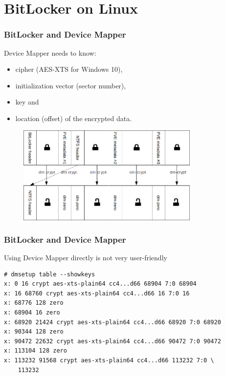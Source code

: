 \documentclass{beamer}
\begin{document}
\section{BitLocker on Linux}

\begin{frame}
	\frametitle{BitLocker and Device Mapper}

	\begin{block}{Device Mapper needs to know:}
		\begin{itemize}
			\item cipher (AES-XTS for Windows 10),
			\item initialization vector (sector number),
			\item key and
			\item location (offset) of the encrypted data.
		\end{itemize}
	\end{block}
\vspace{-0.25cm}
\begin{figure}[ht!]
	\begin{center}
  	  \includegraphics[width=9cm]{img/bitlocker-dm-schema.png}
	\end{center}
	\end{figure}

\end{frame}

\begin{frame}[fragile]
\frametitle{BitLocker and Device Mapper}
\begin{block}{Using Device Mapper directly is not very user-friendly}
	\begin{lstlisting}[frame=none, basicstyle=\ttfamily\small, columns=fullflexible, keepspaces=true]
# dmsetup table --showkeys
x: 0 16 crypt aes-xts-plain64 cc4...d66 68904 7:0 68904
x: 16 68760 crypt aes-xts-plain64 cc4...d66 16 7:0 16
x: 68776 128 zero 
x: 68904 16 zero 
x: 68920 21424 crypt aes-xts-plain64 cc4...d66 68920 7:0 68920
x: 90344 128 zero 
x: 90472 22632 crypt aes-xts-plain64 cc4...d66 90472 7:0 90472
x: 113104 128 zero 
x: 113232 91568 crypt aes-xts-plain64 cc4...d66 113232 7:0 \
	113232
	\end{lstlisting}
\end{block}
\end{frame}
\end{document}
